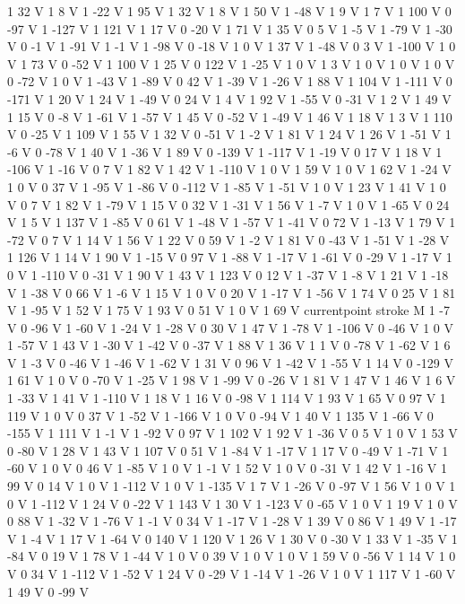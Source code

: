 {{1 32 V
1 8 V
1 -22 V
1 95 V
1 32 V
1 8 V
1 50 V
1 -48 V
1 9 V
1 7 V
1 100 V
0 -97 V
1 -127 V
1 121 V
1 17 V
0 -20 V
1 71 V
1 35 V
0 5 V
1 -5 V
1 -79 V
1 -30 V
0 -1 V
1 -91 V
1 -1 V
1 -98 V
0 -18 V
1 0 V
1 37 V
1 -48 V
0 3 V
1 -100 V
1 0 V
1 73 V
0 -52 V
1 100 V
1 25 V
0 122 V
1 -25 V
1 0 V
1 3 V
1 0 V
1 0 V
1 0 V
0 -72 V
1 0 V
1 -43 V
1 -89 V
0 42 V
1 -39 V
1 -26 V
1 88 V
1 104 V
1 -111 V
0 -171 V
1 20 V
1 24 V
1 -49 V
0 24 V
1 4 V
1 92 V
1 -55 V
0 -31 V
1 2 V
1 49 V
1 15 V
0 -8 V
1 -61 V
1 -57 V
1 45 V
0 -52 V
1 -49 V
1 46 V
1 18 V
1 3 V
1 110 V
0 -25 V
1 109 V
1 55 V
1 32 V
0 -51 V
1 -2 V
1 81 V
1 24 V
1 26 V
1 -51 V
1 -6 V
0 -78 V
1 40 V
1 -36 V
1 89 V
0 -139 V
1 -117 V
1 -19 V
0 17 V
1 18 V
1 -106 V
1 -16 V
0 7 V
1 82 V
1 42 V
1 -110 V
1 0 V
1 59 V
1 0 V
1 62 V
1 -24 V
1 0 V
0 37 V
1 -95 V
1 -86 V
0 -112 V
1 -85 V
1 -51 V
1 0 V
1 23 V
1 41 V
1 0 V
0 7 V
1 82 V
1 -79 V
1 15 V
0 32 V
1 -31 V
1 56 V
1 -7 V
1 0 V
1 -65 V
0 24 V
1 5 V
1 137 V
1 -85 V
0 61 V
1 -48 V
1 -57 V
1 -41 V
0 72 V
1 -13 V
1 79 V
1 -72 V
0 7 V
1 14 V
1 56 V
1 22 V
0 59 V
1 -2 V
1 81 V
0 -43 V
1 -51 V
1 -28 V
1 126 V
1 14 V
1 90 V
1 -15 V
0 97 V
1 -88 V
1 -17 V
1 -61 V
0 -29 V
1 -17 V
1 0 V
1 -110 V
0 -31 V
1 90 V
1 43 V
1 123 V
0 12 V
1 -37 V
1 -8 V
1 21 V
1 -18 V
1 -38 V
0 66 V
1 -6 V
1 15 V
1 0 V
0 20 V
1 -17 V
1 -56 V
1 74 V
0 25 V
1 81 V
1 -95 V
1 52 V
1 75 V
1 93 V
0 51 V
1 0 V
1 69 V
currentpoint stroke M
1 -7 V
0 -96 V
1 -60 V
1 -24 V
1 -28 V
0 30 V
1 47 V
1 -78 V
1 -106 V
0 -46 V
1 0 V
1 -57 V
1 43 V
1 -30 V
1 -42 V
0 -37 V
1 88 V
1 36 V
1 1 V
0 -78 V
1 -62 V
1 6 V
1 -3 V
0 -46 V
1 -46 V
1 -62 V
1 31 V
0 96 V
1 -42 V
1 -55 V
1 14 V
0 -129 V
1 61 V
1 0 V
0 -70 V
1 -25 V
1 98 V
1 -99 V
0 -26 V
1 81 V
1 47 V
1 46 V
1 6 V
1 -33 V
1 41 V
1 -110 V
1 18 V
1 16 V
0 -98 V
1 114 V
1 93 V
1 65 V
0 97 V
1 119 V
1 0 V
0 37 V
1 -52 V
1 -166 V
1 0 V
0 -94 V
1 40 V
1 135 V
1 -66 V
0 -155 V
1 111 V
1 -1 V
1 -92 V
0 97 V
1 102 V
1 92 V
1 -36 V
0 5 V
1 0 V
1 53 V
0 -80 V
1 28 V
1 43 V
1 107 V
0 51 V
1 -84 V
1 -17 V
1 17 V
0 -49 V
1 -71 V
1 -60 V
1 0 V
0 46 V
1 -85 V
1 0 V
1 -1 V
1 52 V
1 0 V
0 -31 V
1 42 V
1 -16 V
1 99 V
0 14 V
1 0 V
1 -112 V
1 0 V
1 -135 V
1 7 V
1 -26 V
0 -97 V
1 56 V
1 0 V
1 0 V
1 -112 V
1 24 V
0 -22 V
1 143 V
1 30 V
1 -123 V
0 -65 V
1 0 V
1 19 V
1 0 V
0 88 V
1 -32 V
1 -76 V
1 -1 V
0 34 V
1 -17 V
1 -28 V
1 39 V
0 86 V
1 49 V
1 -17 V
1 -4 V
1 17 V
1 -64 V
0 140 V
1 120 V
1 26 V
1 30 V
0 -30 V
1 33 V
1 -35 V
1 -84 V
0 19 V
1 78 V
1 -44 V
1 0 V
0 39 V
1 0 V
1 0 V
1 59 V
0 -56 V
1 14 V
1 0 V
0 34 V
1 -112 V
1 -52 V
1 24 V
0 -29 V
1 -14 V
1 -26 V
1 0 V
1 117 V
1 -60 V
1 49 V
0 -99 V
}}
